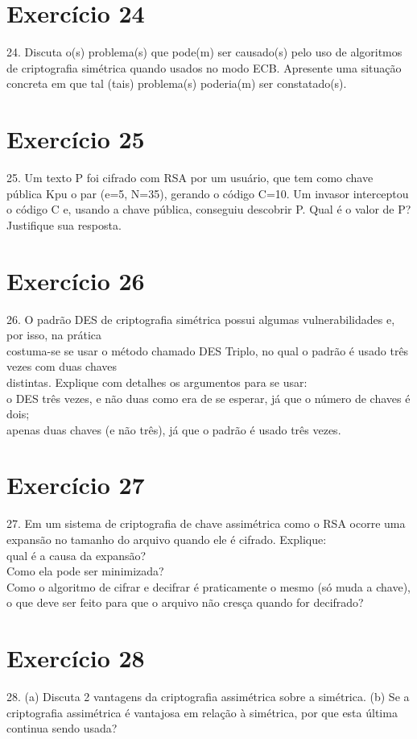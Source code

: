 \documentclass[10pt,a4paper]{article}
\begin{document}
\section*{Exercício 24}
24. Discuta o(s) problema(s) que pode(m) ser causado(s) pelo uso de algoritmos de criptografia simétrica quando usados no modo ECB. Apresente uma situação concreta em que tal (tais) problema(s) poderia(m) ser constatado(s).\\
\section*{Exercício 25}
25. Um texto P foi cifrado com RSA por um usuário, que tem como chave pública Kpu o par (e=5, N=35), gerando o código C=10. Um invasor interceptou o código C e, usando a chave pública, conseguiu descobrir P. Qual é o valor de P? Justifique sua resposta.\\
\section*{Exercício 26}
26. O padrão DES de criptografia simétrica possui algumas vulnerabilidades e, por isso, na prática\\ costuma-se se usar o método chamado DES Triplo, no qual o padrão é usado três vezes com duas chaves\\ distintas. Explique com detalhes os argumentos para se usar:\\
o DES três vezes, e não duas como era de se esperar, já que o número de chaves é dois;\\
apenas duas chaves (e não três), já que o padrão é usado três vezes.\\
\section*{Exercício 27}
27. Em um sistema de criptografia de chave assimétrica como o RSA ocorre uma expansão no tamanho do arquivo quando ele é cifrado. Explique:\\
qual é a causa da expansão?\\
Como ela pode ser minimizada?\\
Como o algoritmo de cifrar e decifrar é praticamente o mesmo (só muda a chave), o que deve ser feito para que o arquivo não cresça quando for decifrado?\\
\section*{Exercício 28}
28. (a) Discuta 2 vantagens da criptografia assimétrica sobre a simétrica.
(b) Se a criptografia assimétrica é vantajosa em relação à simétrica, por que esta última continua sendo usada?\\
\end{document}

